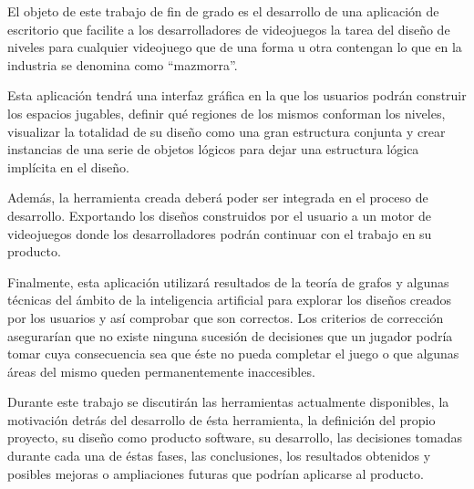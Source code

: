 El objeto de este trabajo de fin de grado es el desarrollo de una aplicación de escritorio que facilite a los desarrolladores de videojuegos la tarea del diseño de niveles para cualquier videojuego que de una forma u otra contengan lo que en la industria se denomina como ``mazmorra''.

Esta aplicación tendrá una interfaz gráfica en la que los usuarios podrán construir los espacios jugables, definir qué regiones de los mismos conforman los niveles, visualizar la totalidad de su diseño como una gran estructura conjunta y crear instancias de una serie de objetos lógicos para dejar una estructura lógica implícita en el diseño.

Además, la herramienta creada deberá poder ser integrada en el proceso de desarrollo. Exportando los diseños construidos por el usuario a un motor de videojuegos donde los desarrolladores podrán continuar con el trabajo en su producto.

Finalmente, esta aplicación utilizará resultados de la teoría de grafos y algunas técnicas del ámbito de la inteligencia artificial para explorar los diseños creados por los usuarios y así comprobar que son correctos. Los criterios de corrección asegurarían que no existe ninguna sucesión de decisiones que un jugador podría tomar cuya consecuencia sea que éste no pueda completar el juego o que algunas áreas del mismo queden permanentemente inaccesibles.

Durante este trabajo se discutirán las herramientas actualmente disponibles, la motivación detrás del desarrollo de ésta herramienta, la definición del propio proyecto, su diseño como producto software, su desarrollo, las decisiones tomadas durante cada una de éstas fases, las conclusiones, los resultados obtenidos y posibles mejoras o ampliaciones futuras que podrían aplicarse al producto.



